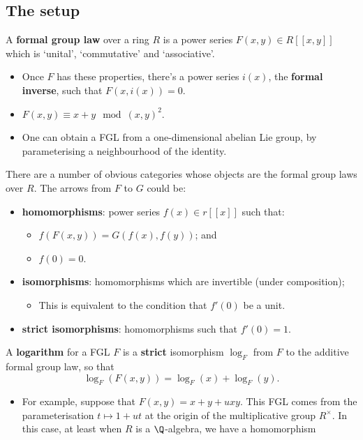 \documentclass[11pt]{article}
\begin{document}
\begin{Formal Group Laws}
\subsection*{The setup}
\begin{itemise}
\renewcommand{\labelitemii}{$\rightarrow$}
\item A \textbf{formal group law} over a ring $R$ is a power series $F(x,y)\in R[[x,y]]$ which is `unital', `commutative' and `associative'.
\begin{itemize}\squishlist
\item Once $F$ has these properties, there's a power series $i(x)$, the \textbf{formal inverse}, such that $F(x,i(x))=0$.
\item $F(x,y)\equiv x+y\mod{(x,y)^2}$.
\item One can obtain a FGL from a one-dimensional abelian Lie group, by parameterising a neighbourhood of the identity.
\end{itemize}
There are a number of obvious categories whose objects are the formal group laws over $R$. The arrows from $F$ to $G$ could be:
\begin{itemize}
\item \textbf{homomorphisms}: power series $f(x)\in r[[x]]$ such that:
\begin{itemize}\squishlist
\item$f(F(x,y))=G(f(x),f(y))$; and
\item $f(0)=0$.
\end{itemize}
\item \textbf{isomorphisms}: homomorphisms which are invertible (under composition);
\begin{itemize}\squishlist
\item This is equivalent to the condition that $f'(0)$ be a unit.
\end{itemize}
\item \textbf{strict isomorphisms}: homomorphisms such that $f'(0)=1$.
\end{itemize}
\item A \textbf{logarithm} for a FGL $F$ is a \textbf{strict} isomorphism $\log_F$ from $F$ to the additive formal group law, so that
\[\log_F(F(x,y))=\log_F(x)+\log_F(y).\]
\begin{itemize}\squishlist
\item For example, suppose that $F(x,y)=x+y+uxy$. This FGL comes from the parameterisation $t\mapsto 1+ut$ at the origin of the multiplicative group $R^\times$. In this case, at least when $R$ is a $\Q$-algebra, we have a homomorphism 

\end{itemize}
\end{itemise}
\end{Formal Group Laws}
\end{document}

